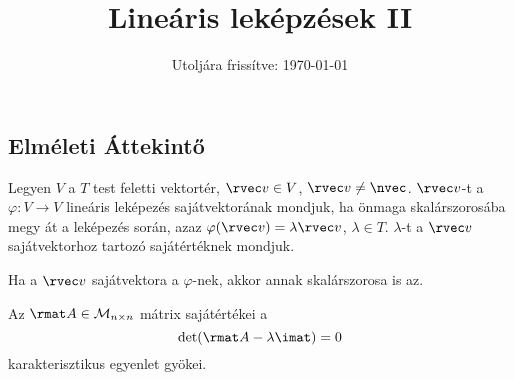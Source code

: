 \documentclass[a4paper, 12pt]{scrartcl}
\title{Lineáris leképzések II}
\date{Utoljára frissítve: \today}
\begin{document}
\maketitle
\subsection{Elméleti Áttekintő}

\begin{definition}
  Legyen $V$ a $T$ test feletti vektortér, $\rvec v \in V$, $\rvec v \neq
    \nvec$. $\rvec v$-t a $\varphi: V \rightarrow V$ lineáris leképezés
  sajátvektorának mondjuk, ha önmaga skalárszorosába megy át a leképezés
  során, azaz $\varphi(\rvec v) = \lambda \rvec v$,  $\lambda \in T$.
  $\lambda$-t a $\rvec v$ sajátvektorhoz tartozó sajátértéknek mondjuk.
\end{definition}

\begin{note}
  Ha a $\rvec v$ sajátvektora a $\varphi$-nek, akkor annak skalárszorosa is az.
\end{note}

\begin{theorem}
  Az $\rmat A \in \mathcal M_{n \times n}$ mátrix sajátértékei a
  $$
    \det(\rmat A - \lambda \imat) = 0
  $$
  karakterisztikus egyenlet gyökei.
\end{theorem}
\end{document}
